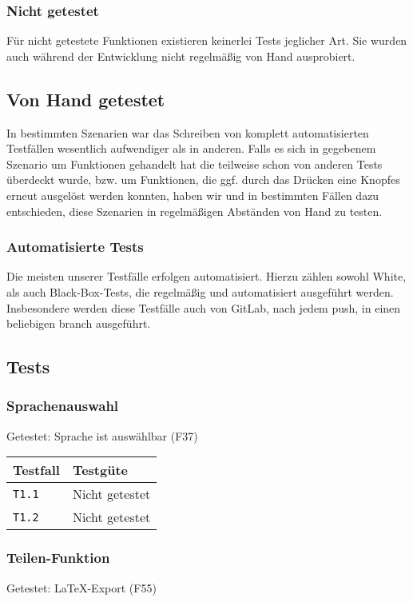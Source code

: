 \documentclass[parskip=full,11pt,twoside]{scrartcl}
\newcommand{\testline}[2]{
    \texttt{#1} & 
    \ifthenelse{\equal{#2}{Nicht getestet}}
        {\cellcolor{red!20}}
        {}
    \ifthenelse{\equal{#2}{Manuell getestet}}
        {\cellcolor{orange!20}}
        {}
    \ifthenelse{\equal{#2}{Automatisiert getestet}}
        {\cellcolor{green!20}}
        {}
    #2 \\ \hline
}
\begin{document}
\subsubsection{Nicht getestet}
Für nicht getestete Funktionen existieren keinerlei Tests jeglicher Art.
Sie wurden auch während der Entwicklung nicht regelmäßig von Hand ausprobiert.

\subsection{Von Hand getestet}
In bestimmten Szenarien war das Schreiben von komplett automatisierten Testfällen wesentlich aufwendiger als in anderen.
Falls es sich in gegebenem Szenario um Funktionen gehandelt hat die teilweise schon von anderen Tests überdeckt wurde,
    bzw. um Funktionen, die ggf. durch das Drücken eine Knopfes erneut ausgelöst werden konnten, haben wir und in bestimmten Fällen dazu entschieden,
    diese Szenarien in regelmäßigen Abständen von Hand zu testen.

\subsubsection{Automatisierte Tests}
Die meisten unserer Testfälle erfolgen automatisiert.
Hierzu zählen sowohl White, als auch Black-Box-Tests, die regelmäßig und automatisiert ausgeführt werden.
Insbesondere werden diese Testfälle auch von GitLab, nach jedem push, in einen beliebigen branch ausgeführt.

\subsection{Tests}

\subsubsection{Sprachenauswahl}
    Getestet:
    Sprache ist auswählbar (F37)

    \label{shortcuts}
    \begin{center}
        \begin{tabular}{ p{9cm} p{4cm}}
            Testfall & Testgüte \\ \hline
            \testline{T1.1}{Nicht getestet}
            \testline{T1.2}{Nicht getestet}
        \end{tabular}
    \end{center}

\subsubsection{Teilen-Funktion}
    Getestet:
    LaTeX-Export (F55)
\end{document}
